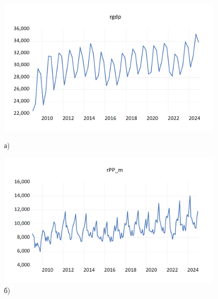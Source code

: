 \documentclass[a4paper, 14pt]{extreport}
\numberwithin{equation}{section}
\numberwithin{equation}{section}
\begin{document}
	\begin{figure}[h!]
		\centering
		\begin{minipage}{0.5\textwidth}
			\centering
			\includegraphics[scale=0.4]{images/image05}
			\caption*{а)}
		\end{minipage}%
		\begin{minipage}{0.5\textwidth}
			\centering
			\includegraphics[scale=0.4]{images/image06}
			\caption*{б)}
		\end{minipage}%
		

\end{figure}
\end{document}
